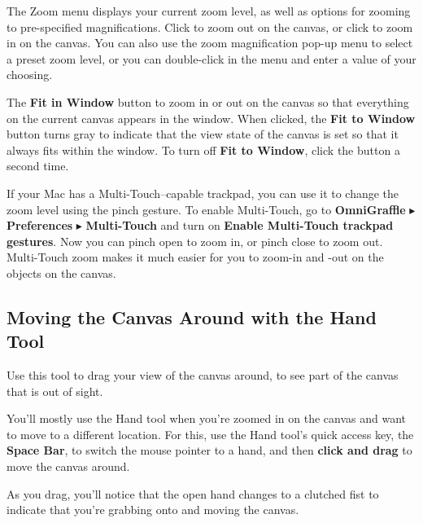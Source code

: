 \documentclass[../main.tex]{subfiles}
\begin{document}

The Zoom menu displays your current zoom level, as well as options for zooming to pre-specified
magnifications. Click  to zoom out on the canvas,
or click  to zoom in on the canvas. You can also
use the zoom magnification pop-up menu to select a preset zoom level, or you can double-click
in the menu and enter a value of your choosing.



The \textbf{Fit in Window} button to zoom in or out on the canvas so that everything on the
current canvas appears in the window. When clicked, the \textbf{Fit to Window} button turns
gray to indicate that the view state of the canvas is set so that it always fits within the
window. To turn off \textbf{Fit to Window}, click the button a second time.


If your Mac has a Multi-Touch--capable trackpad, you can use it to change the zoom level using
the pinch gesture. To enable Multi-Touch, go to \textbf{OmniGraffle} $\blacktriangleright$
\textbf{Preferences} $\blacktriangleright$ \textbf{Multi-Touch} and turn on \textbf{Enable
Multi-Touch trackpad gestures}. Now you can pinch open to zoom in, or pinch close to zoom out.
Multi-Touch zoom makes it much easier for you to zoom-in and -out on the objects on the
canvas.

\subsection{ Moving the Canvas Around with the Hand Tool}

Use this tool to drag your view of the canvas around, to see part of the canvas that is out of
sight.

You'll mostly use the Hand tool when you're zoomed in on the canvas and want to move to a
different location. For this, use the Hand tool's quick access key, the \textbf{Space Bar}, to
switch the mouse pointer to a hand, and then \textbf{click and drag} to move the canvas
around.


As you drag, you'll notice that the open hand changes to a clutched fist to indicate that you're
grabbing onto and moving the canvas.
\end{document}
